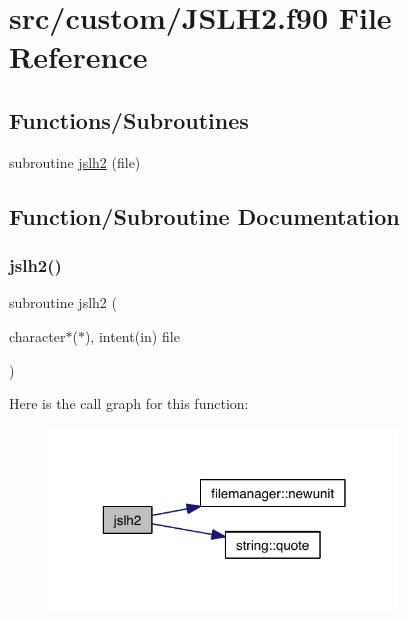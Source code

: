\hypertarget{_j_s_l_h2_8f90}{}\section{src/custom/\+J\+S\+L\+H2.f90 File Reference}
\label{_j_s_l_h2_8f90}
\subsection*{Functions/\+Subroutines}
\begin{DoxyCompactItemize}
\item 
subroutine \hyperlink{_j_s_l_h2_8f90_a7821743e60d69b7b1f90a0e94d6fc5b6}{jslh2} (file)
\end{DoxyCompactItemize}


\subsection{Function/\+Subroutine Documentation}
\mbox{\label{_j_s_l_h2_8f90_a7821743e60d69b7b1f90a0e94d6fc5b6}} 
\subsubsection{\texorpdfstring{jslh2()}{jslh2()}}
{\footnotesize\ttfamily subroutine jslh2 (\begin{DoxyParamCaption}\item[{character$\ast$($\ast$), intent(in)}]{file }\end{DoxyParamCaption})}

Here is the call graph for this function\+:\nopagebreak
\begin{figure}[H]
\begin{center}
\leavevmode
\includegraphics[width=262pt]{_j_s_l_h2_8f90_a7821743e60d69b7b1f90a0e94d6fc5b6_cgraph}
\end{center}
\end{figure}
